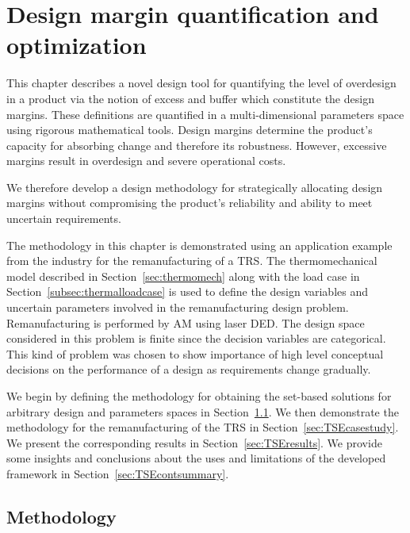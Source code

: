 \chapter{Design margin quantification and optimization}
\label{ch:TSEcont}

This chapter describes a novel design tool for quantifying the level of overdesign in a product via the notion of excess and buffer which constitute the design margins. These definitions are quantified in a multi-dimensional parameters space using rigorous mathematical tools. Design margins determine the product's capacity for absorbing change and therefore its robustness. However, excessive margins result in overdesign and severe operational costs.

We therefore develop a design methodology for strategically allocating design margins without compromising the product's reliability and ability to meet uncertain requirements.

The methodology in this chapter is demonstrated using an application example from the industry for the remanufacturing of a \ac{TRS}. The thermomechanical model described in Section~\ref{sec:thermomech} along with the load case in Section~\ref{subsec:thermalloadcase} is used to define the design variables and uncertain parameters involved in the remanufacturing design problem. Remanufacturing is performed by \ac{AM} using laser \ac{DED}. The design space considered in this problem is finite since the decision variables are categorical. This kind of problem was chosen to show importance of high level conceptual decisions on the performance of a design as requirements change gradually.

We begin by defining the methodology for obtaining the set-based solutions for arbitrary design and parameters spaces in Section~\ref{sec:TSEmethods}. We then demonstrate the methodology for the remanufacturing of the \ac{TRS} in Section~\ref{sec:TSEcasestudy}. We present the corresponding results in Section~\ref{sec:TSEresults}. We provide some insights and conclusions about the uses and limitations of the developed framework in Section~\ref{sec:TSEcontsummary}.

\section{Methodology} \label{sec:TSEmethods}

